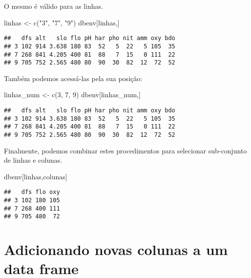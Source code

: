 \documentclass[
]{book}
\newenvironment{Shaded}{\begin{snugshade}}{\end{snugshade}}
\newcommand{\DecValTok}[1]{\textcolor[rgb]{0.00,0.00,0.81}{#1}}
\newcommand{\FunctionTok}[1]{\textcolor[rgb]{0.00,0.00,0.00}{#1}}
\newcommand{\NormalTok}[1]{#1}
\newcommand{\OtherTok}[1]{\textcolor[rgb]{0.56,0.35,0.01}{#1}}
\newcommand{\StringTok}[1]{\textcolor[rgb]{0.31,0.60,0.02}{#1}}
\begin{document}
O mesmo é válido para as linhas.

\begin{Shaded}
\begin{Highlighting}[]
\NormalTok{linhas }\OtherTok{\textless{}{-}} \FunctionTok{c}\NormalTok{(}\StringTok{"3"}\NormalTok{, }\StringTok{"7"}\NormalTok{, }\StringTok{"9"}\NormalTok{)}
\NormalTok{dbenv[linhas,]}
\end{Highlighting}
\end{Shaded}

\begin{verbatim}
##   dfs alt   slo flo pH har pho nit amm oxy bdo
## 3 102 914 3.638 180 83  52   5  22   5 105  35
## 7 268 841 4.205 400 81  88   7  15   0 111  22
## 9 705 752 2.565 480 80  90  30  82  12  72  52
\end{verbatim}

Também podemos acessá-las pela sua posição:

\begin{Shaded}
\begin{Highlighting}[]
\NormalTok{linhas\_num }\OtherTok{\textless{}{-}} \FunctionTok{c}\NormalTok{(}\DecValTok{3}\NormalTok{, }\DecValTok{7}\NormalTok{, }\DecValTok{9}\NormalTok{)}
\NormalTok{dbenv[linhas\_num,]}
\end{Highlighting}
\end{Shaded}

\begin{verbatim}
##   dfs alt   slo flo pH har pho nit amm oxy bdo
## 3 102 914 3.638 180 83  52   5  22   5 105  35
## 7 268 841 4.205 400 81  88   7  15   0 111  22
## 9 705 752 2.565 480 80  90  30  82  12  72  52
\end{verbatim}

Finalmente, podemos combinar estes procedimentos para selecionar sub-conjunto de linhas e colunas.

\begin{Shaded}
\begin{Highlighting}[]
\NormalTok{dbenv[linhas,colunas]}
\end{Highlighting}
\end{Shaded}

\begin{verbatim}
##   dfs flo oxy
## 3 102 180 105
## 7 268 400 111
## 9 705 480  72
\end{verbatim}

\hypertarget{adicionando-novas-colunas-a-um-data-frame}{%
\section{Adicionando novas colunas a um data frame}\label{adicionando-novas-colunas-a-um-data-frame}}
\end{document}
